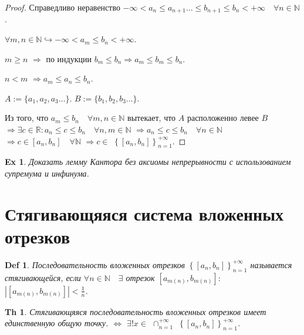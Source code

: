 \documentclass[a5paper, 10pt]{article}
\theoremstyle{plain}
\newtheorem*{theorem}{Th}
\newtheorem{definition}{Def}
\newtheorem{exersise}{Ex}
\newcommand{\N}{\mathbb N}
\newcommand{\R}{\mathbb R}
\newcommand{\hrarrow}{\hookrightarrow}
\newcommand{\Rarrow}{\Rightarrow}
\newcommand{\Lrarrow}{\Leftrightarrow}
\begin{document}
    \begin{proof}
    Справедливо неравенство
    $ -\infty < a_n \leq a_{n+1} \dots \leq b_{n+1} \leq b_n < +\infty \quad \forall n \in \N $.

    $ \forall m, n \in \N \hrarrow -\infty < a_m \leq b_n < +\infty $.

    $ m \geq n $
    $ \Rarrow $ по индукции $ b_m \leq b_n \Rarrow a_m \leq b_m \leq b_n $.

    $ n < m $
    $ \Rarrow a_m \leq a_n \leq b_n $.

    \noindent
    $ A := \{a_1, a_2, a_3 \dots \} $.
    \newline
    $ B := \{b_1, b_2, b_3 \dots \} $.

    Из того, что $ a_m \leq b_n \quad \forall m, n \in \N $
    вытекает, что $ A $ расположенно левее $ B $
    $ \Rarrow \exists c \in \R: a_n \leq c \leq b_n \quad \forall n, m \in \N $
    $ \Rarrow a_n \leq c \leq b_n \quad \forall n \in \N $
    $ \Rarrow c \in \left[ a_n, b_n \right] \quad \forall \N $
    $ \Rarrow c \in $
    $ \left\{ \left[ a_n, b_n \right] \right\}_{n=1}^{+\infty} $.
    \end{proof}

    \begin{exersise}
    Доказать лемму Кантора без аксиомы непрерывности с использованием супремума и инфинума.
    \end{exersise}

    \section{Стягивающяяся система вложенных отрезков}

    \begin{definition}
    Последовательность вложенных отрезков
    $ \left\{ \left[ a_n, b_n \right] \right\}_{n=1}^{+\infty} $
    называется стягивающейся, если
    $ \forall n \in \N \quad \exists $
    отрезок
    $ \left[ a_{m(n)}, b_{m(n)} \right]: $
    $ \left| \left[ a_{m(n)}, b_{m(n)} \right] \right| < \frac{1}{n} $.
    \end{definition}

    \begin{theorem}
    Стягивающяяся последовательность вложенных отрезков имеет единственную общую точку.
    $ \Lrarrow $
    $ \exists! x \in $
    $ \cap_{n=1}^{+\infty} $
    $ \left\{ \left[ a_n, b_n \right] \right\}_{n=1}^{+\infty} $.
    \end{theorem}
\end{document}
